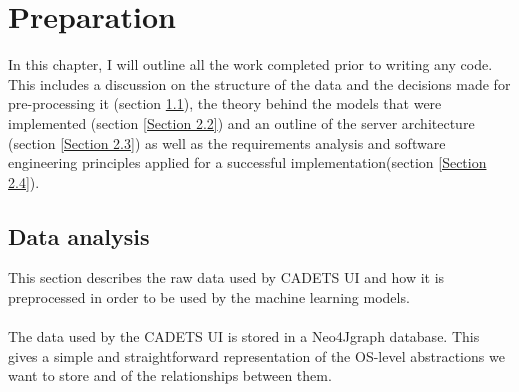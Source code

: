 
	\chapter{Preparation} 
	In this chapter, I will outline all the work completed prior to writing any code. This includes a discussion on the structure of the data and the decisions made for pre-processing it (section \ref{Section 2.1}), the theory behind the models that were implemented (section \ref{Section 2.2}) and an outline of the server architecture (section \ref{Section 2.3}) as well as the requirements analysis and software engineering principles applied for a successful implementation(section \ref{Section 2.4}).
	
	\section{Data analysis} \label{Section 2.1}
	This section describes the raw data used by CADETS UI and how it is preprocessed in order to be used by the machine learning models.
	\\ \\
	The data used by the CADETS UI is stored in a Neo4J\footnotemark[1] graph database. This gives a simple and straightforward representation of the OS-level abstractions we want to store and of the relationships between them.

	
